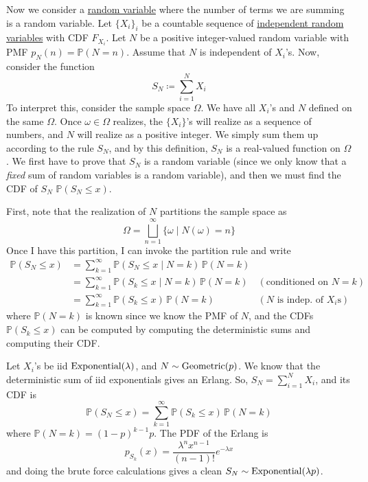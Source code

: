   Now we consider a \hyperref[def:random-variable]{random variable} where the number of terms we are summing is a random variable. Let $\{X_i\}_i$ be a countable sequence of \hyperref[def:independent-random-variables]{independent random variables} with CDF $F_{X_i}$. Let $N$ be a positive integer-valued random variable with PMF $p_N(n) = \mathbb{P}(N = n)$. Assume that $N$ is independent of $X_i$'s. Now, consider the function 
  \begin{equation}
    S_N \coloneqq \sum_{i=1}^N X_i
  \end{equation}
  To interpret this, consider the sample space $\Omega$. We have all $X_i$'s and $N$ defined on the same $\Omega$. Once $\omega \in \Omega$ realizes, the $\{X_i\}$'s will realize as a sequence of numbers, and $N$ will realize as a positive integer. We simply sum them up according to the rule $S_N$, and by this definition, $S_N$ is a real-valued function on $\Omega$. We first have to prove that $S_N$ is a random variable (since we only know that a \textit{fixed} sum of random variables is a random variable), and then we must find the CDF of $S_N$ $\mathbb{P}(S_N \leq x)$. 

  First, note that the realization of $N$ partitions the sample space as 
  \begin{equation}
    \Omega = \bigsqcup_{n = 1}^\infty \{\omega \mid N(\omega) = n\}
  \end{equation}
  Once I have this partition, I can invoke the partition rule and write 
  \begin{align*}
    \mathbb{P}(S_N \leq x) & = \sum_{k=1}^\infty \mathbb{P}(S_N \leq x \mid N = k) \, \mathbb{P}(N = k) \\
    & = \sum_{k=1}^\infty \mathbb{P}(S_k \leq x \mid N = k) \, \mathbb{P}(N = k) & (\text{conditioned on } N = k) \\
    & = \sum_{k=1}^\infty \mathbb{P}(S_k \leq x) \, \mathbb{P}(N = k) & (N \text{ is indep. of } X_i \text{s})
  \end{align*}
  where $\mathbb{P}(N = k)$ is known since we know the PMF of $N$, and the CDFs $\mathbb{P}(S_k \leq x)$ can be computed by computing the deterministic sums and computing their CDF. 

  \begin{example}
    \label{ex:geometric-sum-of-exponentials}
    Let $X_i$'s be iid $\operatorname{Exponential}(\lambda)$, and $N \sim \operatorname{Geometric}(p)$. We know that the deterministic sum of iid exponentials gives an Erlang. So, $S_N = \sum_{i=1}^N X_i$, and its CDF is 
    \begin{equation}
      \mathbb{P}(S_N \leq x) = \sum_{k=1}^\infty \mathbb{P}(S_k \leq x) \, \mathbb{P}(N = k)
    \end{equation}
    where $\mathbb{P}(N = k) = (1 - p)^{k - 1} p$. The PDF of the Erlang is 
    \begin{equation}
      p_{S_k} (x) = \frac{\lambda^n x^{n-1}}{(n - 1)!} e^{-\lambda x}
    \end{equation}
    and doing the brute force calculations gives a clean $S_N \sim \operatorname{Exponential}(\lambda p)$. 
  \end{example}

